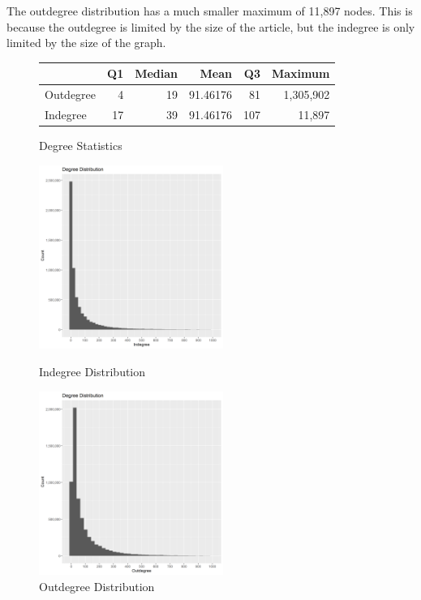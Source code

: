 \documentclass{article}
\begin{document}
The outdegree distribution has a much smaller maximum of 11,897 nodes. This is because the outdegree is limited by the size of the article, but the indegree is only limited by the size of the graph.


\begin{figure}[H]
    \centering
    \caption[]{Degree Statistics}
    \begin{tabular}{lrrrrr}
        \toprule
        & Q1 & Median & Mean & Q3 & Maximum\\
        \midrule
        Outdegree & 4 & 19 & 91.46176 & 81 & 1,305,902\\
        Indegree & 17 & 39 & 91.46176 & 107 & 11,897\\
        \bottomrule
    \end{tabular}
\end{figure}

\begin{figure}[H]
    \centering
    \parbox{6cm}{
    \includegraphics[width=6cm]{in_degree_dist}
    \caption{Indegree Distribution}
    \label{fig:2figsA}}
    \qquad
    \begin{minipage}{6cm}
    \includegraphics[width=6cm]{out_degree_dist}
    \caption{Outdegree Distribution}
    \label{fig:2figsB}
    \end{minipage}
\end{figure}
\end{document}
